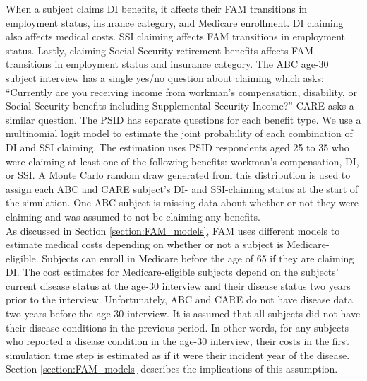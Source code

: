 \noindent When a subject claims DI benefits, it affects their FAM transitions in employment status, insurance category, and Medicare enrollment.
DI claiming also affects medical costs.
SSI claiming affects FAM transitions in employment status.
Lastly, claiming Social Security retirement benefits affects FAM transitions in employment status and insurance category.
The ABC age-30 subject interview has a single yes/no question about claiming which asks: ``Currently are you receiving income from workman's compensation, disability, or Social Security benefits including Supplemental Security Income?'' CARE asks a similar question. The PSID has separate questions for each benefit type. We use a multinomial logit model to estimate the joint probability of each combination of DI and SSI claiming. The estimation uses PSID respondents aged 25 to 35 who were claiming at least one of the following benefits: workman's compensation, DI, or SSI. A Monte Carlo random draw generated from this distribution is used to assign each ABC and CARE subject's DI- and SSI-claiming status at the start of the simulation. One ABC subject is missing data about whether or not they were claiming and was assumed to not be claiming any benefits.\\

\noindent As discussed in Section \ref{section:FAM_models}, FAM uses different models to estimate medical costs depending on whether or not a subject is Medicare-eligible. Subjects can enroll in Medicare before the age of 65 if they are claiming DI. The cost estimates for Medicare-eligible subjects depend on the subjects' current disease status at the age-30 interview and their disease status two years prior to the interview. Unfortunately, ABC and CARE do not have disease data two years before the age-30 interview. It is assumed that all subjects did not have their disease conditions in the previous period. In other words, for any subjects who reported a disease condition in the age-30 interview, their costs in the first simulation time step is estimated as if it were their incident year of the disease. Section \ref{section:FAM_models} describes the implications of this assumption. \\




